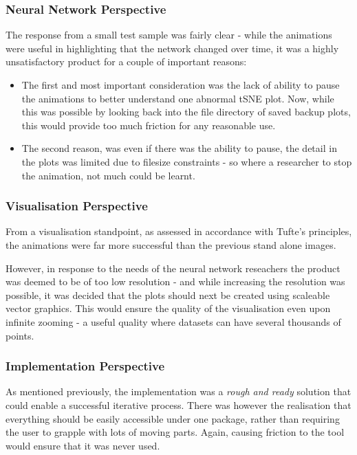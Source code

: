 \documentclass[a4paper,11pt,titlepage]{article}
\begin{document}
		\subsubsection{Neural Network Perspective}
		The response from a small test sample was fairly clear - while the animations were useful in highlighting that the network changed over time, it was a highly unsatisfactory product for a couple of important reasons: 
		\begin{itemize}
			\item The first and most important consideration was the lack of ability to pause the animations to better understand one abnormal tSNE plot. Now, while this was possible by looking back into the file directory of saved backup plots, this would provide too much friction for any reasonable use.
			\item The second reason, was even if there was the ability to pause, the detail in the plots was limited due to filesize constraints - so where a researcher to stop the animation, not much could be learnt.
		\end{itemize}
		
		\subsubsection{Visualisation Perspective}
		From a visualisation standpoint, as assessed in accordance with Tufte's principles, the animations were far more successful than the previous stand alone images.
		\par 
		However, in response to the needs of the neural network reseachers the product was deemed to be of too low resolution - and while increasing the resolution was possible, it was decided that the plots should next be created using scaleable vector graphics. This would ensure the quality of the visualisation even upon infinite zooming - a useful quality where datasets can have several thousands of points. 
		\subsubsection{Implementation Perspective}	
		As mentioned previously, the implementation was a \textit{rough and ready} solution that could enable a successful iterative process. There was however the realisation that everything should be easily accessible under one package, rather than requiring the user to grapple with lots of moving parts. Again, causing friction to the tool would ensure that it was never used.
		
\end{document}

